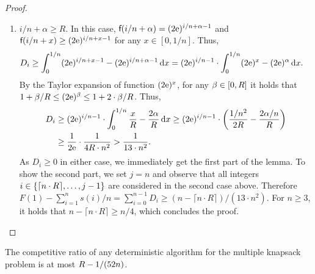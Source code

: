 \begin{proof}
\begin{enumerate}
\item $i/n + \alpha \geq R$.
In this case, $\textsf{f}(i/n + \alpha) = (2 \mathrm{e})^{i/n + \alpha - 1}$ and 
$\textsf{f}(i/n + x) \geq (2 \mathrm{e})^{i/n + x - 1}$ for any $x \in [0,1/n]$.
Thus, 
\begin{align*}
    D_i 
      & \geq \int_{0}^{1/n} (2 \mathrm{e})^{i/n + x - 1} - (2 \mathrm{e})^{i/n + \alpha - 1} \,\mathrm{d} x 
       = (2 \mathrm{e})^{i/n - 1} \cdot 
        \int_{0}^{1/n} (2 \mathrm{e})^x - (2 \mathrm{e})^\alpha \,\mathrm{d} x .
\end{align*}
%
By the Taylor expansion of function $(2\mathrm{e})^x$,
for any $\beta \in [0,R]$ it holds that
$1 + \beta/R \leq (2 \mathrm{e})^\beta \leq 1 + 2 \cdot \beta/R$. Thus, 
%
\begin{align*}
    D_i & \geq (2 \mathrm{e})^{i/n - 1} \cdot 
        \int_{0}^{1/n} \frac{x}{R} - \frac{2 \alpha}{R} \,\mathrm{d} x 
      \geq (2 \mathrm{e})^{i/n - 1} \cdot \left( \frac{1/n^2}{2 R} - \frac{2 \alpha / n}{R} \right) \\
      & \geq \frac{1}{2 \mathrm{e}} \cdot \frac{1}{4 R \cdot n^2} 
      > \frac{1}{13 \cdot n^2}.
\end{align*}
As $D_i \geq 0$ in either case, we immediately get the first part
of the lemma. 
To show the second part, we set $j = n$ and 
observe that all integers $i \in \{\lceil n \cdot R \rceil, \ldots, j-1\}$ 
are considered in the second case above.
Therefore $F(1) - \sum_{i=1}^n s(i)/n = \sum_{i=0}^{n-1} D_i \geq 
(n-\lceil n \cdot R \rceil)/ (13 \cdot n^2)$. 
For $n \geq 3$, it holds that $n-\lceil n \cdot R \rceil \geq n/4$, which
concludes the proof.
\qedhere
\end{enumerate}
\end{proof}



\begin{theorem}
\label{thm:upper-bound}
The competitive ratio of any deterministic algorithm \DET for the multiple knapsack problem 
is at most $R - 1/(52 n)$.
\end{theorem}

